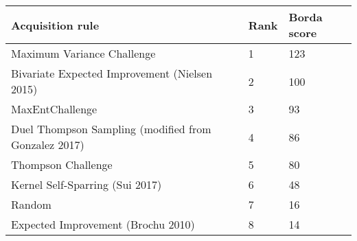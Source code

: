 \begin{tabular}{lll}
Acquisition rule & Rank & Borda score \\ 
\hline 
Maximum Variance Challenge & 1 & 123 \\ 
Bivariate Expected Improvement (Nielsen 2015) & 2 & 100 \\ 
MaxEntChallenge & 3 & 93 \\ 
Duel Thompson Sampling (modified from Gonzalez 2017) & 4 & 86 \\ 
Thompson Challenge & 5 & 80 \\ 
Kernel Self-Sparring (Sui 2017) & 6 & 48 \\ 
Random & 7 & 16 \\ 
Expected Improvement (Brochu 2010) & 8 & 14 \\ 
\hline 
\end{tabular}